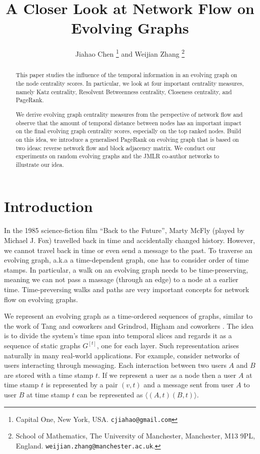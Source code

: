 \documentclass[12pt]{article}
\title{A Closer Look at Network Flow on Evolving Graphs}
\author{Jiahao Chen \thanks{
Capital One,
New York, USA.
\texttt{cjiahao@gmail.com}
}
 and
Weijian Zhang
\thanks{%
  School of Mathematics,
The University of Manchester,
                Manchester, M13 9PL, England.
\texttt{weijian.zhang@manchester.ac.uk}.
}
}
\theoremstyle{definition}
\begin{document}


\maketitle

\begin{abstract}
This paper studies the influence of the temporal information in an evolving graph on the node centrality scores.
In particular, we look at four important centrality measures, namely Katz centrality,
Resolvent Betweenness centrality, Closeness centrality, and PageRank.

We derive evolving graph centrality measures from the perspective of network flow and
observe that the amount of temporal distance between nodes has an important impact on the final evolving graph centrality scores, especially on the top ranked nodes.
Build on this idea, we introduce a generalised PageRank on evolving graph that is based on two ideas:
reverse network flow and block adjacency matrix.
We conduct our experiments on random evolving graphs and the JMLR co-author networks to illustrate our idea.
\end{abstract}

\section{Introduction}
\label{sec:introduction}

In the 1985 science-fiction film ``Back to the Future'', Marty McFly (played by Michael J. Fox) travelled back in time and accidentally changed history.
However, we cannot travel back in time or even send a message to the past.
To traverse an evolving graph, a.k.a a time-dependent graph, one has to consider order of time stamps. In particular, a walk on an evolving graph needs to be time-preserving, meaning we
can not pass a massage (through an edge) to a node at a earlier time.
Time-preversing walks and paths are very important concepts for
network flow on evolving graphs.

We represent an evolving graph as a time-ordered sequences of graphs, similar to the work of Tang and coworkers \cite{nicosia13, tang09, tang102, tang10} and Grindrod, Higham and coworkers \cite{grindrod13,grindrod11}. The idea is to divide the system's time span into temporal slices and regards it as a sequence of static graphs $G^{[t]}$, one for each layer. Such representation arises naturally in many real-world applications. For example,
consider networks of users interacting through messaging. Each interaction between two users $A$ and $B$ are stored with a time stamp $t$. If we represent a user as a node then a user $A$ at time stamp $t$ is represented by a pair $(v,t)$ and a message sent from user $A$ to user $B$ at time stamp $t$ can be represented as $\langle (A, t) (B, t) \rangle$.
\end{document}
